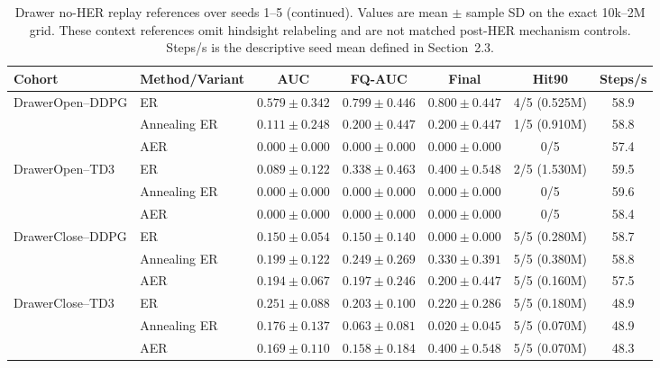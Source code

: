 \begin{table}[t]
\ContinuedFloat
\centering
\small
\setlength{\tabcolsep}{4pt}
\begin{tabular}{llccccc}
\toprule
Cohort & Method/Variant & AUC & FQ-AUC & Final & Hit90 & Steps/s \\
\midrule
DrawerOpen--DDPG & ER & \(0.579\pm0.342\) & \(0.799\pm0.446\) &
\(0.800\pm0.447\) & 4/5 (0.525M) & 58.9 \\
 & Annealing ER & \(0.111\pm0.248\) & \(0.200\pm0.447\) &
\(0.200\pm0.447\) & 1/5 (0.910M) & 58.8 \\
 & AER & \(0.000\pm0.000\) & \(0.000\pm0.000\) &
\(0.000\pm0.000\) & 0/5 & 57.4 \\
\addlinespace[2pt]
DrawerOpen--TD3 & ER & \(0.089\pm0.122\) & \(0.338\pm0.463\) &
\(0.400\pm0.548\) & 2/5 (1.530M) & 59.5 \\
 & Annealing ER & \(0.000\pm0.000\) & \(0.000\pm0.000\) &
\(0.000\pm0.000\) & 0/5 & 59.6 \\
 & AER & \(0.000\pm0.000\) & \(0.000\pm0.000\) &
\(0.000\pm0.000\) & 0/5 & 58.4 \\
\addlinespace[2pt]
DrawerClose--DDPG & ER & \(0.150\pm0.054\) & \(0.150\pm0.140\) &
\(0.000\pm0.000\) & 5/5 (0.280M) & 58.7 \\
 & Annealing ER & \(0.199\pm0.122\) & \(0.249\pm0.269\) &
\(0.330\pm0.391\) & 5/5 (0.380M) & 58.8 \\
 & AER & \(0.194\pm0.067\) & \(0.197\pm0.246\) &
\(0.200\pm0.447\) & 5/5 (0.160M) & 57.5 \\
\addlinespace[2pt]
DrawerClose--TD3 & ER & \(0.251\pm0.088\) & \(0.203\pm0.100\) &
\(0.220\pm0.286\) & 5/5 (0.180M) & 48.9 \\
 & Annealing ER & \(0.176\pm0.137\) & \(0.063\pm0.081\) &
\(0.020\pm0.045\) & 5/5 (0.070M) & 48.9 \\
 & AER & \(0.169\pm0.110\) & \(0.158\pm0.184\) &
\(0.400\pm0.548\) & 5/5 (0.070M) & 48.3 \\
\bottomrule
\end{tabular}
\caption{Drawer no-HER replay references over seeds 1--5 (continued). Values are mean $\pm$ sample SD on the exact
10k--2M grid. These context references omit hindsight relabeling and are not
matched post-HER mechanism controls. Steps/s is the descriptive seed mean
defined in Section~2.3.}
\label{tab:supp-drawer-aer-noher}
\end{table}
